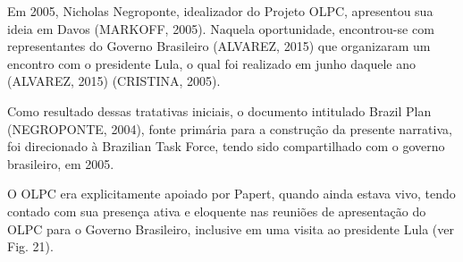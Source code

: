 \documentclass[
12pt,		%
openright,	%
twoside,  %
a4paper,			%
chapter=TITLE,		%
english,			%
french,				%
spanish,			%
brazil				%
]{USPSC-classe/USPSC}
\begin{document}
Em 2005, Nicholas Negroponte, idealizador do Projeto OLPC, apresentou sua ideia em Davos (MARKOFF, 2005). Naquela oportunidade, encontrou-se com representantes do Governo Brasileiro (ALVAREZ, 2015) que organizaram um encontro com o presidente Lula, o qual foi realizado em junho daquele ano (ALVAREZ, 2015) (CRISTINA, 2005).









Como resultado dessas tratativas iniciais, o documento intitulado \textquotedbl Brazil Plan \textquotedbl  (NEGROPONTE, 2004), fonte prim\'aria para a constru\c{c}\~ao da presente narrativa, foi direcionado \`a \textquotedbl Brazilian Task Force\textquotedbl , tendo sido compartilhado com o governo brasileiro, em 2005.









O OLPC era explicitamente apoiado por Papert, quando ainda estava vivo, tendo contado com sua presen\c{c}a ativa e eloquente nas reuni\~oes de apresenta\c{c}\~ao do OLPC para o Governo Brasileiro, inclusive em uma visita ao presidente Lula (ver Fig. 21).
\end{document}
